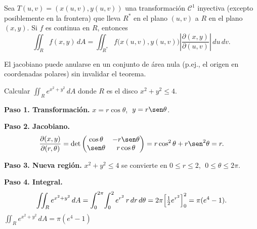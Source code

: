 \begin{theorem}
Sea $T(u,v)=(x(u,v),y(u,v))$ una transformación $\mathcal{C}^1$
inyectiva (excepto posiblemente en la frontera) que lleva $R^*$ en
el plano $(u,v)$ a $R$ en el plano $(x,y)$. Si $f$ es continua en
$R$, entonces
\[
\iint_R f(x,y)\,dA
= \iint_{R^*} f\bigl(x(u,v),y(u,v)\bigr)
  \left|\frac{\partial(x,y)}{\partial(u,v)}\right|\,du\,dv.
\]
\end{theorem}

\begin{rem}
El jacobiano puede anularse en un conjunto de área nula (p.ej., el
origen en coordenadas polares) sin invalidar el teorema.
\end{rem}

\begin{example}
Calcular $\displaystyle\iint_R e^{x^2+y^2}\,dA$ donde $R$ es el disco
$x^2+y^2\le 4$.
\begin{myproof}
\textbf{Paso 1. Transformación.}
$x=r\cos\theta$, $\;y=r\sen\theta$.

\textbf{Paso 2. Jacobiano.}
\[
\frac{\partial(x,y)}{\partial(r,\theta)}
= \det\begin{pmatrix}
    \cos\theta & -r\sen\theta \\
    \sen\theta &  r\cos\theta
  \end{pmatrix}
= r\cos^2\theta + r\sen^2\theta = r.
\]

\textbf{Paso 3. Nueva región.}
$x^2+y^2\le4$ se convierte en $0\le r\le2$, $\;0\le\theta\le2\pi$.

\textbf{Paso 4. Integral.}
\[
\iint_R e^{x^2+y^2}\,dA
= \int_0^{2\pi}\!\int_0^2 e^{r^2}\,r\,dr\,d\theta
= 2\pi\Bigl[\tfrac{1}{2}e^{r^2}\Bigr]_0^2
= \pi(e^4-1).
\]
$\boxed{\displaystyle\iint_R e^{x^2+y^2}\,dA = \pi(e^4-1)}$
\end{myproof}
\end{example}


